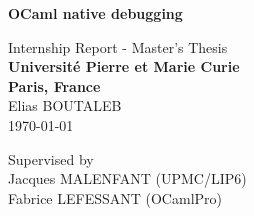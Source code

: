 \thispagestyle{empty}
\begin{center}

\vspace*{1.4cm}
{\LARGE \textbf{OCaml native debugging}}

\begin{figure}
    \centering
    \hspace{1em}
    \hfill
\end{figure}

\vspace*{1.0cm}

{\LARGE Internship Report - Master's Thesis}\\

\vspace{1.0cm}
{\LARGE \textbf{Université Pierre et Marie Curie}}\\
\vspace*{0.3cm}
{\LARGE \textbf{Paris, France}}\\
\vspace*{1.0cm}
{\LARGE Elias BOUTALEB}
\\
\vspace*{0.5cm}
\today
\vspace*{1.0cm}

Supervised by\\
    Jacques MALENFANT (UPMC/LIP6)\\
    Fabrice LEFESSANT (OCamlPro)\\
\vspace*{0.5cm}
\vspace{3cm}


\end{center}

